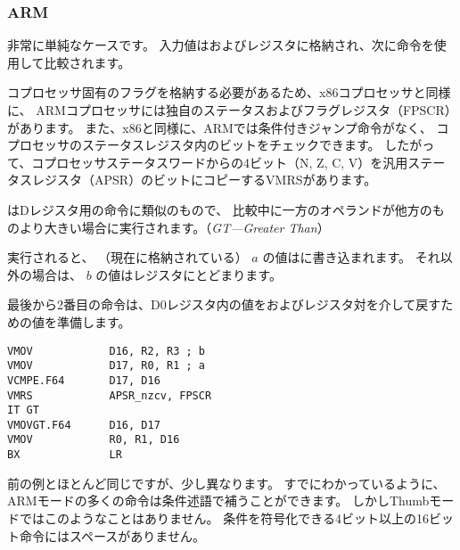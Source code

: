 \subsubsection{ARM}

\myparagraph{\OptimizingXcodeIV (\ARMMode)}



非常に単純なケースです。
入力値はおよびレジスタに格納され、次に命令を使用して比較されます。

コプロセッサ固有のフラグを格納する必要があるため、x86コプロセッサと同様に、
ARMコプロセッサには独自のステータスおよびフラグレジスタ（\ac{FPSCR}）があります。 
また、x86と同様に、ARMでは条件付きジャンプ命令がなく、
コプロセッサのステータスレジスタ内のビットをチェックできます。 
したがって、コプロセッサステータスワードからの4ビット（N, Z, C, V）を汎用ステータスレジスタ（\ac{APSR}）のビットにコピーするVMRSがあります。

はDレジスタ用の命令に類似のもので、
比較中に一方のオペランドが他方のものより大きい場合に実行されます。（\emph{GT---Greater Than}）

実行されると、 （現在に格納されている） $a$ の値はに書き込まれます。 
それ以外の場合は、 $b$ の値はレジスタにとどまります。


最後から2番目の命令は、D0レジスタ内の値をおよびレジスタ対を介して戻すための値を準備します。

\myparagraph{\OptimizingXcodeIV (\ThumbTwoMode)}

\begin{lstlisting}[caption=\OptimizingXcodeIV (\ThumbTwoMode),style=customasmARM]
VMOV            D16, R2, R3 ; b
VMOV            D17, R0, R1 ; a
VCMPE.F64       D17, D16
VMRS            APSR_nzcv, FPSCR
IT GT 
VMOVGT.F64      D16, D17
VMOV            R0, R1, D16
BX              LR
\end{lstlisting}

前の例とほとんど同じですが、少し異なります。 
すでにわかっているように、ARMモードの多くの命令は条件述語で補うことができます。 
しかしThumbモードではこのようなことはありません。 
条件を符号化できる4ビット以上の16ビット命令にはスペースがありません。

